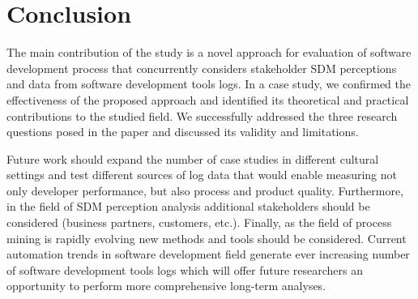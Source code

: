 \section{Conclusion}

The main contribution of the study is a novel approach for evaluation of software development process that concurrently considers stakeholder SDM perceptions and data from software development tools logs. In a case study, we confirmed the effectiveness of the proposed approach and identified its theoretical and practical contributions to the studied field. We successfully addressed the three research questions posed in the paper and discussed its validity and limitations. 

Future work should expand the number of case studies in different cultural settings and test different sources of log data that would enable measuring not only developer performance, but also process and product quality. Furthermore, in the field of SDM perception analysis additional stakeholders should be considered (business partners, customers, etc.). Finally, as the field of process mining is rapidly evolving new methods and tools should be considered. Current automation trends in software development field generate ever increasing number of software development tools logs which will offer future researchers an opportunity to perform more comprehensive long-term analyses. 
